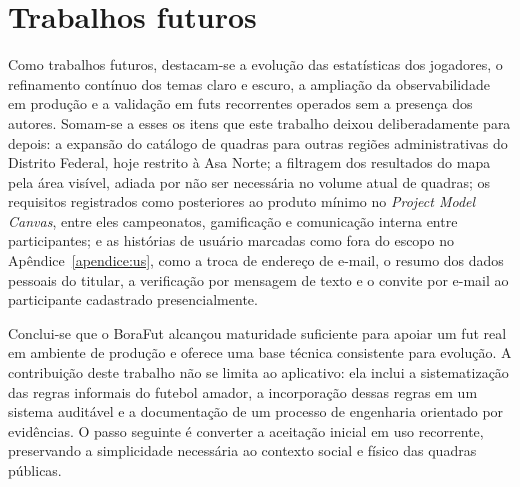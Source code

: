 \section{Trabalhos futuros}
Como trabalhos futuros, destacam-se a evolução das estatísticas dos jogadores, o refinamento contínuo dos temas claro e escuro, a ampliação da observabilidade em produção e a validação em futs recorrentes operados sem a presença dos autores. Somam-se a esses os itens que este trabalho deixou deliberadamente para depois: a expansão do catálogo de quadras para outras regiões administrativas do Distrito Federal, hoje restrito à Asa Norte; a filtragem dos resultados do mapa pela área visível, adiada por não ser necessária no volume atual de quadras; os requisitos registrados como posteriores ao produto mínimo no \textit{Project Model Canvas}, entre eles campeonatos, gamificação e comunicação interna entre participantes; e as histórias de usuário marcadas como fora do escopo no Apêndice~\ref{apendice:us}, como a troca de endereço de e-mail, o resumo dos dados pessoais do titular, a verificação por mensagem de texto e o convite por e-mail ao participante cadastrado presencialmente.

Conclui-se que o BoraFut alcançou maturidade suficiente para apoiar um fut real em ambiente de produção e oferece uma base técnica consistente para evolução. A contribuição deste trabalho não se limita ao aplicativo: ela inclui a sistematização das regras informais do futebol amador, a incorporação dessas regras em um sistema auditável e a documentação de um processo de engenharia orientado por evidências. O passo seguinte é converter a aceitação inicial em uso recorrente, preservando a simplicidade necessária ao contexto social e físico das quadras públicas.
